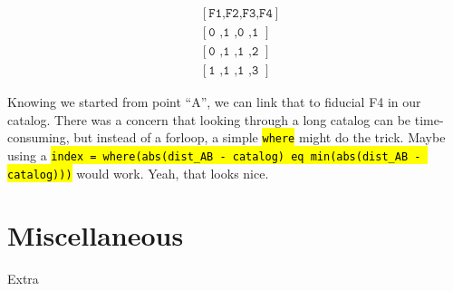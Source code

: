 \documentclass[10pt]{scrartcl}
\begin{document}
\begin{align}
  &[\texttt{F1,F2,F3,F4}]\\
  &[\texttt{0 ,1 ,0 ,1 }]\\
  &[\texttt{0 ,1 ,1 ,2 }]\\
  &[\texttt{1 ,1 ,1 ,3 }]
\end{align}


Knowing we started from point ``A'', we can link that to fiducial F4 in our catalog. There was a concern that looking through a long catalog can be time-consuming, but instead of a forloop, a simple \hl{\texttt{where}} might do the trick. Maybe using a \hl{\texttt{index = where(abs(dist\_AB - catalog) eq min(abs(dist\_AB - catalog)))}} would work. Yeah, that looks nice.



\section{Miscellaneous} %
\label{sec:miscellaneous}
Extra
\end{document}
